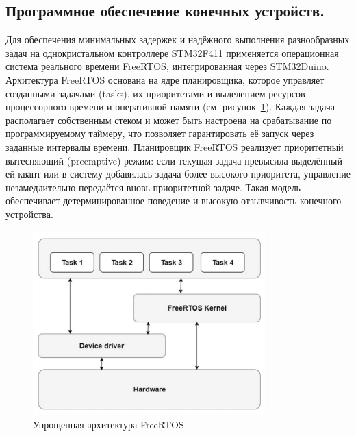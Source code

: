 \documentclass[14pt,a4paper]{extarticle}
\begin{document}

\subsection{Программное обеспечение конечных устройств.}

Для обеспечения минимальных задержек и надёжного выполнения разнообразных задач на однокристальном контроллере STM32F411 применяется операционная система реального времени FreeRTOS,
интегрированная через STM32Duino. Архитектура FreeRTOS основана на ядре планировщика, которое управляет созданными задачами (tasks), их приоритетами и выделением ресурсов процессорного
времени и оперативной памяти (см. рисунок~\ref{fig:simple_arch_of_FreeRTOS}). Каждая задача располагает собственным стеком и может быть настроена на срабатывание по программируемому
таймеру, что позволяет гарантировать её запуск через заданные интервалы времени. Планировщик FreeRTOS реализует приоритетный вытесняющий (preemptive) режим: если текущая задача
превысила выделённый ей квант или в систему добавилась задача более высокого приоритета, управление незамедлительно передаётся вновь приоритетной задаче. Такая модель обеспечивает
детерминированное поведение и высокую отзывчивость конечного устройства.

\begin{figure}[H]
    \centering
    \includegraphics[width=0.8\textwidth]{images/FreeRTOS_arch.png}
    \caption{Упрощенная архитектура FreeRTOS \cite{IMG_RTOS_architectures}}
    \label{fig:simple_arch_of_FreeRTOS}
\end{figure}
\end{document}
